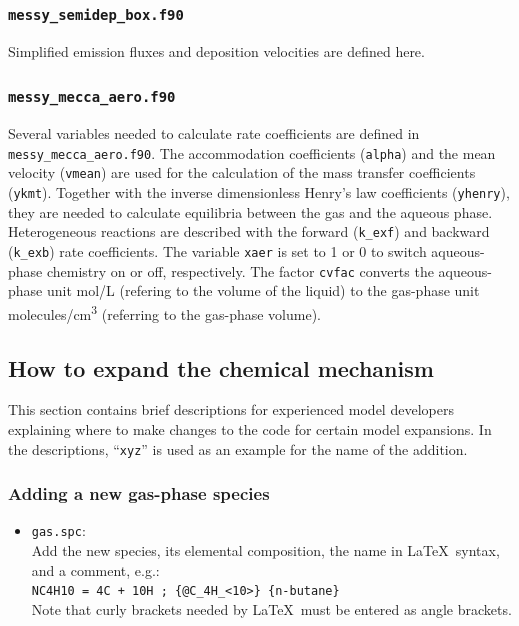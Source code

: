 \documentclass[twoside]{article}
\def\nosep{\setlength\parsep{0mm}\setlength\topsep{0mm}\setlength\itemsep{0mm}}
\begin{document}
\subsubsection{{\tt messy\_semidep\_box.f90}}

Simplified emission fluxes and deposition velocities are defined here.

\subsubsection{{\tt messy\_mecca\_aero.f90}}

Several variables needed to calculate rate coefficients are defined in
\verb|messy_mecca_aero.f90|. The accommodation coefficients
(\verb|alpha|) and the mean velocity (\verb|vmean|) are used for the
calculation of the mass transfer coefficients (\verb|ykmt|). Together
with the inverse dimensionless Henry's law coefficients (\verb|yhenry|),
they are needed to calculate equilibria between the gas and the aqueous
phase. Heterogeneous reactions are described with the forward
(\verb|k_exf|) and backward (\verb|k_exb|) rate coefficients. The
variable \verb|xaer| is set to 1 or 0 to switch aqueous-phase chemistry
on or off, respectively. The factor \verb|cvfac| converts the
aqueous-phase unit \unit{mol/L} (refering to the volume of the liquid)
to the gas-phase unit \unit{molecules/cm^3} (referring to the gas-phase
volume).

\subsection{How to expand the chemical mechanism}

This section contains brief descriptions for experienced model
developers explaining where to make changes to the code for certain
model expansions. In the descriptions, ``\verb|xyz|'' is used as an
example for the name of the addition.

\subsubsection{Adding a new gas-phase species}

\begin{itemize}\nosep
\item \verb|gas.spc|:\\
  Add the new species, its elemental composition,
  the name in La\TeX\ syntax, and a comment, e.g.:\\
  \verb|NC4H10 = 4C + 10H ; {@C_4H_<10>} {n-butane}|\\
  Note that curly brackets needed by La\TeX\ must be entered as angle
  brackets.
\end{itemize}
\end{document}
